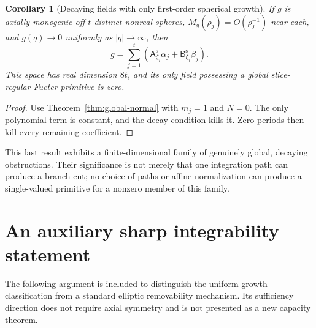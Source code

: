 \documentclass[11pt,a4paper]{article}
\numberwithin{equation}{section}
\newtheorem{corollary}[theorem]{Corollary}
\theoremstyle{definition}
\theoremstyle{remark}
\newcommand{\Asym}{\mathsf A^{\mathrm s}}
\newcommand{\Bsym}{\mathsf B^{\mathrm s}}
\begin{document}
\begin{corollary}[Decaying fields with only first-order spherical growth]
\label{cor:decaying}
If $g$ is axially monogenic off $t$ distinct nonreal spheres,
$M_g(\rho_j)=O(\rho_j^{-1})$ near each, and $g(q)\to0$ uniformly as
$|q|\to\infty$, then
\[
 g=\sum_{j=1}^{t}
       (\Asym_{\zeta_j}\alpha_j+\Bsym_{\zeta_j}\beta_j).
\]
This space has real dimension $8t$, and its only field possessing a
global slice-regular Fueter primitive is zero.
\end{corollary}
\begin{proof}
Use Theorem~\ref{thm:global-normal} with $m_j=1$ and $N=0$.
The only polynomial term is constant, and the decay condition kills it.
Zero periods then kill every remaining coefficient.
\end{proof}
This last result exhibits a finite-dimensional family of genuinely
global, decaying obstructions. Their significance is not merely that
one integration path can produce a branch cut; no choice of paths or
affine normalization can produce a single-valued primitive for a
nonzero member of this family.

\section{An auxiliary sharp integrability statement}
\label{sec:L2}

The following argument is included to distinguish the uniform growth
classification from a standard elliptic removability mechanism. Its
sufficiency direction does not require axial symmetry and is not
presented as a new capacity theorem.
\end{document}
